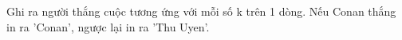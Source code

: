 Ghi ra người thắng cuộc tương ứng với mỗi số k trên 1 dòng. Nếu Conan thắng in ra 'Conan', ngược lại in ra 'Thu Uyen'.  

\
